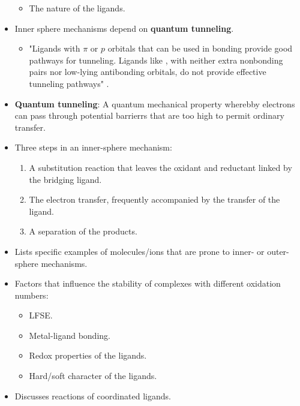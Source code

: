 \documentclass[../notes.tex]{subfiles}
\begin{document}
\begin{itemize}
\begin{itemize}
        \item The nature of the ligands.
    \end{itemize}
    \item Inner sphere mechanisms depend on \textbf{quantum tunneling}.
    \begin{itemize}
        \item "Ligands with $\pi$ or $p$ orbitals that can be used in bonding provide good pathways for tunneling. Ligands like , with neither extra nonbonding pairs nor low-lying antibonding orbitals, do not provide effective tunneling pathways" \parencite[463]{bib:MiesslerFischerTarr}.
    \end{itemize}
    \item \textbf{Quantum tunneling}: A quantum mechanical property wherebby electrons can pass through potential barrierrs that are too high to permit ordinary transfer.
    \item Three steps in an inner-sphere mechanism:
    \begin{enumerate}
        \item A substitution reaction that leaves the oxidant and reductant linked by the bridging ligand.
        \item The electron transfer, frequently accompanied by the transfer of the ligand.
        \item A separation of the products.
    \end{enumerate}
    \item Lists specific examples of molecules/ions that are prone to inner- or outer-sphere mechanisms.
    \item Factors that influence the stability of complexes with different oxidation numbers:
    \begin{itemize}
        \item LFSE.
        \item Metal-ligand bonding.
        \item Redox properties of the ligands.
        \item Hard/soft character of the ligands.
    \end{itemize}
    \item Discusses reactions of coordinated ligands.
\end{itemize}
\end{document}

